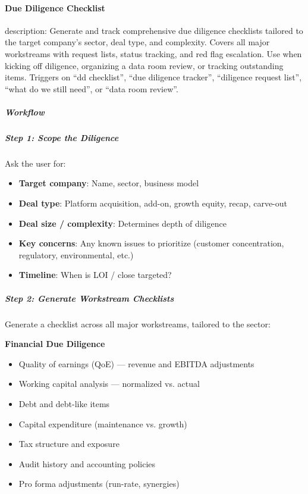 \documentclass[11pt]{article}
\begin{document}
\paragraph{Due Diligence Checklist}\mbox{}\par

description: Generate and track comprehensive due diligence checklists tailored to the target company's sector, deal type, and complexity. Covers all major workstreams with request lists, status tracking, and red flag escalation. Use when kicking off diligence, organizing a data room review, or tracking outstanding items. Triggers on ``dd checklist'', ``due diligence tracker'', ``diligence request list'', ``what do we still need'', or ``data room review''.


\subparagraph{Workflow}\mbox{}\par

\subparagraph{Step 1: Scope the Diligence}\mbox{}\par

Ask the user for:

\begin{itemize}[leftmargin=*,itemsep=2pt,topsep=2pt]
\item {} \textbf{Target company}: Name, sector, business model
\item {} \textbf{Deal type}: Platform acquisition, add-on, growth equity, recap, carve-out
\item {} \textbf{Deal size / complexity}: Determines depth of diligence
\item {} \textbf{Key concerns}: Any known issues to prioritize (customer concentration, regulatory, environmental, etc.)
\item {} \textbf{Timeline}: When is LOI / close targeted?
\end{itemize}

\subparagraph{Step 2: Generate Workstream Checklists}\mbox{}\par

Generate a checklist across all major workstreams, tailored to the sector:


\textbf{Financial Due Diligence}

\begin{itemize}[leftmargin=*,itemsep=2pt,topsep=2pt]
\item {} Quality of earnings (QoE) — revenue and EBITDA adjustments
\item {} Working capital analysis — normalized vs. actual
\item {} Debt and debt-like items
\item {} Capital expenditure (maintenance vs. growth)
\item {} Tax structure and exposure
\item {} Audit history and accounting policies
\item {} Pro forma adjustments (run-rate, synergies)
\end{itemize}
\end{document}
